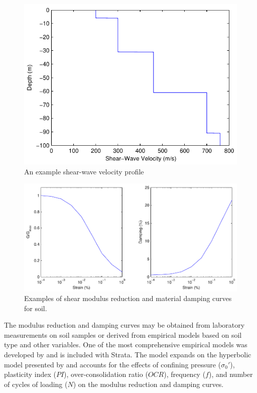 \documentclass[12pt,oneside]{book}
\begin{document}
\begin{figure}[tb]
    \begin{center}
        \includegraphics{figures/siteResponse/vsProfile.pdf}
    \end{center}
    \caption{An example shear-wave velocity profile}
    \label{fig:siteResponse:vsProfile}
\end{figure}
\begin{figure}[tb]
    \centering
    \includegraphics[width=\textwidth]{figures/siteResponse/nlLab.pdf}
    \caption{Examples of shear modulus reduction and material damping curves for soil.}
    \label{fig:siteResponse:nlLab}
\end{figure}

The modulus reduction and damping curves may be obtained from laboratory measurements on soil
samples or derived from empirical models based on soil type and other variables.  One of the most
comprehensive empirical models was developed by \citet{darendeli:01} and is included with Strata.
The model expands on the hyperbolic model presented by \citet{hardin:72} and accounts for the
effects of confining pressure ($\sigma_0'$), plasticity index ($PI$), over-consolidation ratio
($OCR$), frequency ($f$), and number of cycles of loading ($N$) on the modulus reduction and damping
curves. 
\end{document}
